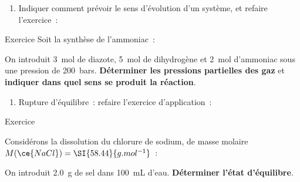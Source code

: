 \documentclass[a4paper, 12pt, final, garamond]{book}
\begin{document}
\begin{enumerate}[resume]
    \item Indiquer comment prévoir le sens d'évolution d'un système, et refaire
        l'exercice~:
\end{enumerate}
\begin{NCexem}[width=\linewidth, breakable]{Exercice}
    Soit la synthèse de l'ammoniac~:


    On introduit \SI{3}{mol} de diazote, \SI{5}{mol} de dihydrogène et
    \SI{2}{mol} d'ammoniac sous une pression de \SI{200}{bars}.
    \textbf{Déterminer les pressions partielles des gaz} et \textbf{indiquer
    dans quel sens se produit la réaction}.
\end{NCexem}
\begin{enumerate}[resume]
    \item Rupture d'équilibre~: refaire l'exercice d'application~:
\end{enumerate}
\begin{NCexem}[width=\linewidth]{Exercice}

    Considérons la dissolution du chlorure de sodium, de masse molaire
    $M(\ce{NaCl}) = \SI{58.44}{g.mol^{-1}}$~:


    On introduit \SI{2.0}{g} de sel dans \SI{100}{mL} d'eau. \textbf{Déterminer
    l'état d'équilibre}.
\end{NCexem}
\end{document}
